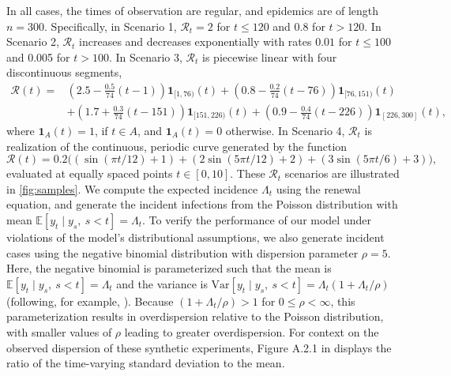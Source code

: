 \documentclass[10pt,letterpaper]{article}
\newcommand{\lr}[1]{\left(#1\right)}
\def\bbE{\mathbb{E}}
\def\calR{\mathcal{R}}
\begin{document}
In all cases, the times of observation are regular, and epidemics are of length
$n=300$. Specifically, in Scenario 1, $\calR_t = 2$ for $t\leq 120$ and 0.8 for $t>120$. In
Scenario 2, $\calR_t$ increases and decreases exponentially with rates $0.01$
for $t\leq 100$ and 0.005 for $t>100$. In Scenario 3, $\calR_t$ is piecewise linear
with four discontinuous segments, 
\begin{equation}
  \begin{split}
    \calR(t) =& \lr{2.5 - \frac{0.5}{74}\lr{t-1}} \boldsymbol{1}_{[1,76)}(t)
     + \lr{0.8 - \frac{0.2}{74}\lr{t-76}} \boldsymbol{1}_{[76,151)}(t) \\
    & + \lr{1.7 + \frac{0.3}{74}\lr{t-151}} \boldsymbol{1}_{[151,226)}(t)
       + \lr{0.9 - \frac{0.4}{74}\lr{t-226}} \boldsymbol{1}_{[226,300]}(t),
  \end{split}
\end{equation}
where $\boldsymbol{1}_{A}(t) = 1$, if $t\in A$, and $\boldsymbol{1}_{A}(t)=0$ otherwise. 
In Scenario 4, $\calR_t$ is realization of the 
continuous, periodic curve generated by the function 
\begin{equation}
  \calR(t) = 0.2 \big(\lr{\sin(\pi t/12) + 1} + \lr{2 \sin\lr{5 \pi t / 12} + 2} 
  + \lr{3 \sin(5\pi t / 6) + 3}\big),
\end{equation} 
evaluated at equally spaced points $t\in [0,10]$. These $\calR_t$ scenarios are
illustrated in \autoref{fig:samples}. We compute the expected incidence
$\Lambda_t$ using the renewal equation, and generate the incident infections
from the Poisson distribution with mean $\bbE[y_t \mid y_s,\ s<t] = \Lambda_t$.
To verify the performance of our model under violations of the model's
distributional assumptions, we also generate incident cases using the negative
binomial distribution with dispersion parameter $\rho = 5$. Here, the negative
binomial is parameterized such that the mean is
$\bbE[y_t\mid y_s,\ s<t] = \Lambda_t$ and the variance is $\textrm{Var}[y_t \mid
y_s,\ s<t] = \Lambda_t(1 +
\Lambda_t / \rho)$ (following, for example, \cite{gressani2022epilps}). Because
$(1 + \Lambda_t / \rho)> 1$ for  $0\leq\rho <\infty$, this parameterization results
in overdispersion relative to the Poisson distribution, with smaller values of
$\rho$ leading to greater overdispersion. For context on the observed dispersion
of these synthetic experiments, Figure A.2.1 in  displays the
ratio of the time-varying standard deviation to the mean. 
\end{document}
